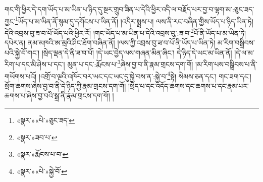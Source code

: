 གང་གི་ཕྱིར་དེ་དག་ཡོད་པ་མ་ཡིན་པ་ཉིད་དུ་སྔར་གྲུབ་ཟིན་པ་དེའི་ཕྱིར་འདི་ལ་བརྗོད་པར་བྱ་བ་ལྷག་མ་:ཅུང་ཟད་ཀྱང་\footnote{«སྣར་»«པེ་»ཅུང་ཟད་}ཡོད་པ་མ་ཡིན་ནོ་སྙམ་དུ་དགོངས་པ་ཡིན་ནོ། །འདིར་སྨྲས་པ། ལས་ནི་རང་བཞིན་གྱིས་ཡོད་པ་ཉིད་ཡིན་ཏེ། དེའི་འབྲས་བུ་ཟ་བ་པོ་ཡོད་པའི་ཕྱིར་རོ། །གང་ཡོད་པ་མ་ཡིན་པ་དེའི་འབྲས་བུ་:ཟ་བ་\footnote{«སྣར་»ཟབ་པ་}པོ་ནི་ཡོད་པ་མ་ཡིན་ཏེ། དཔེར་ན། ནམ་མཁའི་ཨ་མྲའི་ཤིང་ཐོག་བཞིན་ནོ། །ལས་ཀྱི་འབྲས་བུ་ཟ་བ་པོ་ནི་ཡོད་པ་ཡིན་ཏེ། མ་རིག་བསྒྲིབས་པའི་སྐྱེ་བོ་གང་། །སྲེད་ལྡན་དེ་ནི་ཟ་བ་པོ། །དེ་ཡང་བྱེད་ལས་གཞན་མིན་ཞིང་། དེ་ཉིད་དེ་ཡང་མ་ཡིན་ནོ། །དེ་ལ་མ་རིག་པ་དང་མི་ཤེས་པ་དང་། མུན་པ་དང་:རྨོངས་པ་\footnote{«སྣར་»རྨོངས་པ་བ་}ཞེས་བྱ་བ་ནི་རྣམ་གྲངས་དག་གོ། །མ་རིག་པས་བསྒྲིབས་པ་ནི་གཡོགས་པའོ། །འགྲོ་བ་ལྔའི་འཁོར་བར་ཡང་དང་ཡང་དུ་སྐྱེ་བས་ན་:སྐྱེ་བ་\footnote{«སྣར་»«པེ་»སྐྱེ་བོ་}སྟེ། སེམས་ཅན་དང་། གང་ཟག་དང་། སྲོག་ཆགས་ཞེས་བྱ་བ་ནི་དེ་ཉིད་ཀྱི་རྣམ་གྲངས་དག་གོ། །སྲེད་པ་དང་འདོད་ཆགས་དང་ཆགས་པ་དང་རྣམ་པར་ཆགས་པ་ཞེས་བྱ་བའི་སྒྲ་ནི་རྣམ་གྲངས་དག་གོ། །
